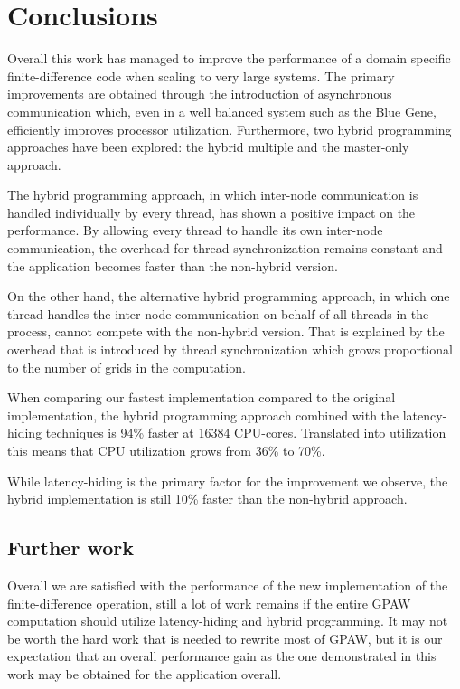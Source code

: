 \documentclass[conference]{IEEEtran}
\begin{document}
\section{Conclusions}
Overall this work has managed to improve the performance of a domain specific finite-difference code when scaling to very large systems. The primary improvements are obtained through the introduction of asynchronous communication which, even in a well balanced system such as the Blue Gene, efficiently improves processor utilization. Furthermore, two hybrid programming approaches have been explored: the hybrid multiple and the master-only approach. 

The hybrid programming approach, in which inter-node communication is handled individually by every thread, has shown a positive impact on the performance. By allowing every thread to handle its own inter-node communication, the overhead for thread synchronization remains constant and the application becomes faster than the non-hybrid version.

On the other hand, the alternative hybrid programming approach, in which one thread handles the inter-node communication on behalf of all threads in the process, cannot compete with the non-hybrid version. That is explained by the overhead that is introduced by thread synchronization which grows proportional to the number of grids in the computation.

When comparing our fastest implementation compared to the original implementation, the hybrid programming approach combined with the latency-hiding techniques is 94\% faster at 16384 CPU-cores. Translated into utilization this means that CPU utilization grows from 36\% to 70\%.

While latency-hiding is the primary factor for the improvement we observe, the hybrid implementation is still 10\% faster than the non-hybrid approach.

\subsection{Further work}
Overall we are satisfied with the performance of the new implementation of the finite-difference operation, still a lot of work remains if the entire GPAW computation should utilize latency-hiding and hybrid programming. It may not be worth the hard work that is needed to rewrite most of GPAW, but it is our expectation that an overall performance gain as the one demonstrated in this work may be obtained for the application overall.
\end{document}

